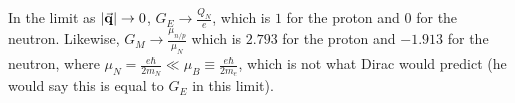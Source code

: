 \documentclass[a4paper,twoside,master.tex]{subfiles}
\begin{document}
In the limit as $ \abs{\va{q}} \to 0 $, $ G_E \to \frac{Q_N}{e} $, which is $ 1 $ for the proton and $ 0 $ for the neutron. Likewise, $ G_M \to \frac{\mu_{n/p}}{\mu_N} $ which is $ 2.793 $ for the proton and $ -1.913 $ for the neutron, where $ \mu_N = \frac{e \hbar}{2m_N} \ll \mu_B \equiv \frac{e \hbar}{2m_e} $, which is not what Dirac would predict (he would say this is equal to $ G_E $ in this limit).
\end{document}
